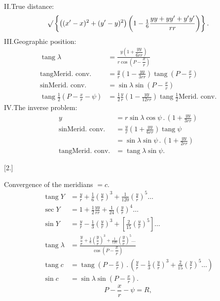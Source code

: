 II.\quad True distance:
\[
\surd\left\{\left((x'-x)^2+(y'-y)^2\right)
 \left(1-\tfrac16\frac{yy+yy'+y'y'}{rr}\right)\right\}.
\]
III.\quad Geographic position:
\[
\begin{aligned}
\operatorname{tang}\lambda&=\frac{y\left(1+\dfrac{yy}{6rr}\right)}{r\cos\left(P-\dfrac xr\right)}\\
\operatorname{tang}\text{Merid.\ conv.}
 &=\frac yr\left(1-\frac{yy}{3rr}\right)\operatorname{tang}\left(P-\frac xr\right)\\
\sin\text{Merid.\ conv.}&=\sin\lambda\sin\left(P-\frac xr\right)\\
\operatorname{tang}\tfrac12\left(P-\frac xr-\psi\right)
 &=\tfrac12\frac yr\left(1-\frac{yy}{12rr}\right)\operatorname{tang}\tfrac12
 \text{Merid.\ conv.}
\end{aligned}
\]
IV.\quad The inverse problem:
\[
\begin{aligned}
y&=r\sin\lambda\cos\psi\,.\,\left(1+\frac{yy}{3rr}\right)\\
\sin\text{Merid.\ conv.}&=\frac yr\left(1+\frac{yy}{6rr}\right)\operatorname{tang}\psi\\
 &=\sin\lambda\sin\psi\,.\,\left(1+\frac{yy}{2rr}\right)\\
\operatorname{tang}\text{Merid.\ conv.}&=\operatorname{tang}\lambda\sin\psi.
\end{aligned}
\]

\begin{center}[2.]\end{center}
Convergence of the meridians \(=c\).
\[
\begin{aligned}
\operatorname{tang}Y&=\frac yr+\tfrac16\left(\frac yr\right)^3+
 \tfrac1{120}\left(\frac yr\right)^5\ldots\\
\sec Y&=1+\tfrac12\frac{yy}{rr}+\tfrac1{24}\left(\frac yr\right)^4\ldots\\
\sin Y&=\frac yr-\tfrac13\left(\frac yr\right)^3+
 \left[\tfrac2{15}\left(\frac yr\right)^5\right]\ldots\\
\operatorname{tang}\lambda&=
 \frac{\dfrac yr+\tfrac16\left(\dfrac yr\right)^3+\tfrac1{120}\left(\dfrac yr\right)^5\ldots}
 {\cos\left(P-\dfrac xr\right)}\\
\operatorname{tang}c&=\operatorname{tang}\left(P-\frac xr\right)\,.\,
 \left(\frac yr-\tfrac13\left(\frac yr\right)^3+\tfrac2{15}\left(\frac yr\right)^5\ldots\right)\\
\sin c&=\sin\lambda\sin\left(P-\frac xr\right).
\end{aligned}
\]
\noindent [Setting]
\[
P-\frac xr-\psi=R,
\]

